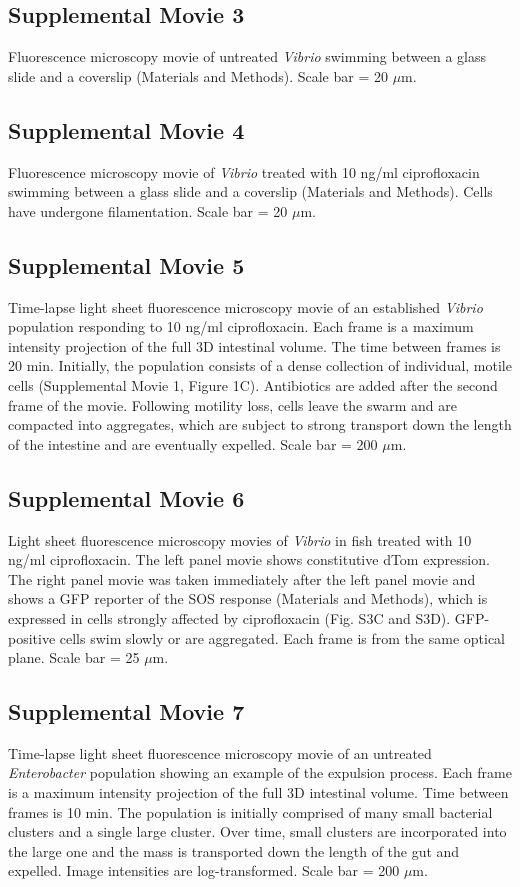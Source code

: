 \documentclass[12pt]{article}
\begin{document}
\subsection*{Supplemental Movie 3}
Fluorescence microscopy movie of untreated \textit{Vibrio} swimming between a glass slide and a coverslip (Materials and Methods). Scale bar = 20 $\mu$m.

\subsection*{Supplemental Movie 4}
Fluorescence microscopy movie of \textit{Vibrio} treated with 10 ng/ml ciprofloxacin swimming between a glass slide and a coverslip (Materials and Methods). Cells have undergone filamentation. Scale bar = 20 $\mu$m.

\subsection*{Supplemental Movie 5}
Time-lapse light sheet fluorescence microscopy movie of an established \textit{Vibrio} population responding to 10 ng/ml ciprofloxacin. Each frame is a maximum intensity projection of the full 3D intestinal volume.  The time between frames is 20 min. Initially, the population consists of a dense collection of individual, motile cells (Supplemental Movie 1, Figure 1C). Antibiotics are added after the second frame of the movie.  Following motility loss, cells leave the swarm and are compacted into aggregates, which are subject to strong transport down the length of the intestine and are eventually expelled. Scale bar = 200 $\mu$m.

\subsection*{Supplemental Movie 6}
Light sheet fluorescence microscopy movies of \textit{Vibrio} in fish treated with 10 ng/ml ciprofloxacin. The left panel movie shows constitutive dTom expression. The right panel movie was taken immediately after the left panel movie and shows a GFP reporter of the SOS response (Materials and Methods), which is expressed in cells strongly affected by ciprofloxacin (Fig. S3C and S3D). GFP-positive cells swim slowly or are aggregated. Each frame is from the same optical plane. Scale bar = 25 $\mu$m. 

\subsection*{Supplemental Movie 7}
Time-lapse light sheet fluorescence microscopy movie of an untreated \textit{Enterobacter} population showing an example of the expulsion process. Each frame is a maximum intensity projection of the full 3D intestinal volume. Time between frames is 10 min. The population is initially comprised of many small bacterial clusters and a single large cluster. Over time, small clusters are incorporated into the large one and the mass is transported down the length of the gut and expelled. Image intensities are log-transformed. Scale bar = 200 $\mu$m.
\end{document}
